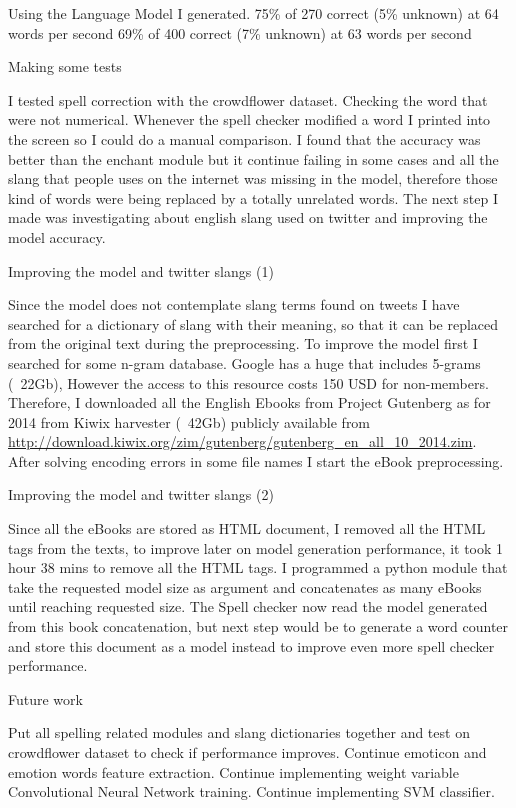 Using the Language Model I generated.
75\% of 270 correct (5\% unknown) at 64 words per second 
69\% of 400 correct (7\% unknown) at 63 words per second

Making some tests

I tested spell correction with the crowdflower dataset. Checking the word that were not numerical. Whenever the spell checker modified a word I printed into the screen so I could do a manual comparison.
I found that the accuracy was better than the enchant module but it continue failing in some cases and all the slang that people uses on the internet was missing in the model, therefore those kind of words were being replaced by a totally unrelated words.
The next step I made was investigating about english slang used on twitter and improving the model accuracy.

Improving the model and twitter slangs (1)

Since the model does not contemplate slang terms found on tweets I have searched for a dictionary of slang with their meaning, so that it can be replaced from the original text during the preprocessing.
To improve the model first I searched for some n-gram database. Google has a huge that includes 5-grams (~22Gb), However the access to this resource costs 150 USD for non-members\cite{LDCGoogle5-gram}. Therefore, I downloaded all the English Ebooks from Project Gutenberg as for 2014 from Kiwix harvester\cite{kiwix} (~42Gb) publicly available from \url{http://download.kiwix.org/zim/gutenberg/gutenberg_en_all_10_2014.zim}. After solving encoding errors in some file names I start the eBook preprocessing.

Improving the model and twitter slangs (2)

Since all the eBooks are stored as HTML document, I removed all the HTML tags from the texts, to improve later on model generation performance, it took 1 hour 38 mins to remove all the HTML tags.
I programmed a python module that take the requested model size as argument and concatenates as many eBooks until reaching requested size.
The Spell checker now read the model generated from this book concatenation, but next step would be to generate a word counter and store this document as a model instead to improve even more spell checker performance.

Future work

Put all spelling related modules and slang dictionaries together and test on crowdflower dataset to check if performance improves.
Continue emoticon and emotion words feature extraction.
Continue implementing weight variable Convolutional Neural Network training.
Continue implementing SVM classifier.

